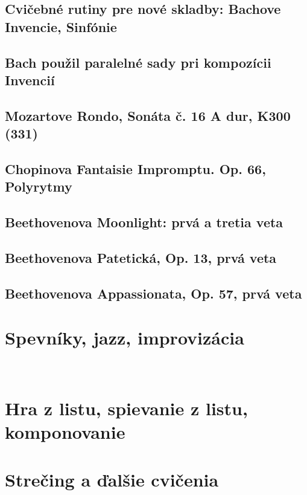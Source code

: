 \documentclass[11pt,a4paper]{book}
\begin{document}
\subsection{Cvičebné rutiny pre nové skladby: Bachove Invencie, Sinfónie}\label{s:bach-inventions}

\subsection{Bach použil paralelné sady pri kompozícii Invencií}\label{s:bach-sets}

\subsection{Mozartove Rondo, Sonáta č. 16 A dur, K300 (331)}\label{s:mozart-rondo}

\subsection{Chopinova Fantaisie Impromptu. Op. 66, Polyrytmy}\label{s:chopin-impromptu}

\subsection{Beethovenova Moonlight: prvá a tretia veta}\label{s:beethoven-moonlight}

\subsection{Beethovenova Patetická, Op. 13, prvá veta}\label{s:beethoven-patetique}

\subsection{Beethovenova Appassionata, Op. 57, prvá veta}\label{s:beethoven-apassionata}

\section{Spevníky, jazz, improvizácia}\label{s:fake-books}
\ 
\section{Hra z listu, spievanie z listu, komponovanie}\label{s:sight-reading}

\section{Strečing a ďalšie cvičenia}\label{s:stretching}
\end{document}
